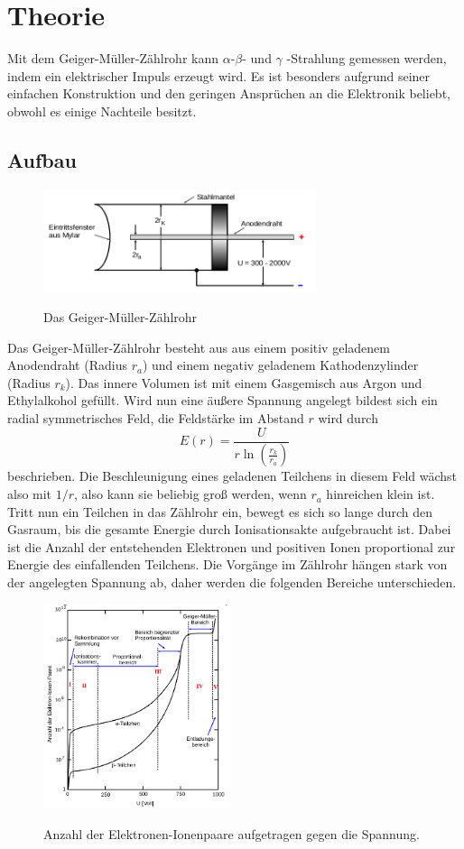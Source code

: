 \section{Theorie}
\label{sec:Theorie}

Mit dem Geiger-Müller-Zählrohr kann $\alpha$-\;$\beta$- und $\gamma$ -Strahlung gemessen
werden, indem ein elektrischer Impuls erzeugt wird. Es ist besonders aufgrund seiner
einfachen Konstruktion und den geringen Ansprüchen an die Elektronik beliebt, obwohl es
einige Nachteile besitzt.

\subsection{Aufbau}


\begin{figure}
  \centering
  \includegraphics[width=8cm]{geiger.png}
  \caption{Das Geiger-Müller-Zählrohr}
  \label{fig:geiger}
  \cite{skript}
\end{figure}
Das Geiger-Müller-Zählrohr besteht aus aus einem positiv geladenem Anodendraht (Radius $r_a$) und
einem negativ geladenem Kathodenzylinder (Radius $r_k$).
Das innere Volumen ist mit einem Gasgemisch aus Argon und
Ethylalkohol gefüllt. Wird nun eine äußere Spannung angelegt bildest sich ein
radial symmetrisches Feld, die Feldstärke im Abstand $r$ wird durch
\begin{equation}
  E(r)=\frac{U}{r\ln(\frac{r_k}{r_a})}
\end{equation}
beschrieben. Die Beschleunigung eines geladenen Teilchens in diesem Feld
wächst also  mit $1/r$, also kann sie beliebig groß werden, wenn $r_a$ hinreichen
klein ist.
Tritt nun ein Teilchen in das Zählrohr ein, bewegt es sich so lange durch den
Gasraum, bis die gesamte Energie durch Ionisationsakte aufgebraucht ist.
Dabei ist die Anzahl der entstehenden Elektronen und positiven Ionen proportional
zur Energie des einfallenden Teilchens.
Die Vorgänge im Zählrohr hängen stark von der angelegten Spannung ab, daher werden
die folgenden Bereiche unterschieden.
\begin{figure}
  \centering
  \includegraphics[height=6cm]{diagramm.png}
  \caption{Anzahl der Elektronen-Ionenpaare aufgetragen gegen die Spannung.}
  \label{fig:diagramm}
  \cite{skript}
\end{figure}

